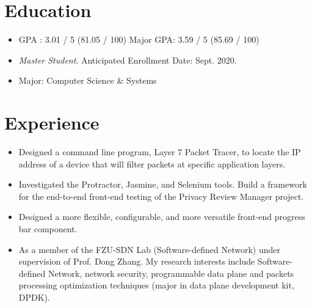 \documentclass{resume}
\begin{document}



\section{Education}
\begin{itemize}
  \textit{Bachelor of Engineer} in Computer Science (CS)
  \item GPA : 3.01 / 5 (81.05 / 100) Major GPA: 3.59 / 5 (85.69 / 100)
\end{itemize}

\begin{itemize}
  \item \textit{Master Student}. Anticipated Enrollment Date: Sept. 2020.
  \item Major: Computer Science & Systems
\end{itemize}


\section{Experience}
\begin{itemize}
  \item Designed a command line program, Layer 7 Packet Tracer, to locate the IP address of a device that will filter packets at specific application layers.
  \item Investigated the Protractor, Jasmine, and Selenium tools. Build a framework for the end-to-end front-end testing of the Privacy Review Manager project.
  \item Designed a more flexible, configurable, and more versatile front-end progress bar component.
\end{itemize}

\begin{itemize}
  \item As a member of the FZU-SDN Lab (Software-defined Network) under supervision of Prof. Dong Zhang. My research
  interests include Software-defined Network, network security, programmable data plane and packets processing
  optimization techniques (major in data plane development kit, DPDK).
\end{itemize}
\end{document}
